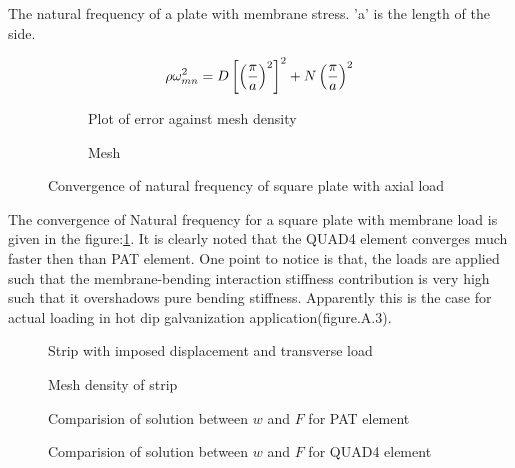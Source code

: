 \documentclass[main.tex]{subfiles}
\begin{document}
The natural frequency of a plate with membrane stress. 'a' is the length of the side.

\begin{equation}{\label{eq:S_N}}
\rho \omega_{mn}^{2} = D \left[ \left( \frac{\pi}{a}\right)^2 \right]^2 + N \left(\frac{\pi}{a} \right)^2 
\end{equation} 

\begin{figure}[t]
\centering
\begin{subfigure}[t]{0.75\textwidth}
\centering


\caption{Plot of error against mesh density}
\label{fig:S_N}
\end{subfigure} \hfill
\begin{subfigure}[t]{0.24\textwidth}
\centering


\caption{Mesh}
\label{fig:Mesh_Density_S}
\end{subfigure}

\caption{Convergence of natural frequency of square plate with axial load}
\end{figure}

The convergence of Natural frequency for a square plate with membrane load is given in the figure:\ref{fig:S_N}. It is clearly noted that the QUAD4 element converges much faster then than PAT element. One point to notice is that, the loads are applied such that the membrane-bending interaction stiffness contribution is very high such that it overshadows pure bending stiffness. Apparently this is the case for actual loading in hot dip galvanization application(figure.A.3). 

\begin{figure}[h!]
\centering

\caption{Strip with imposed displacement and transverse load}
\label{fig:Strip_LOAD_FvsD1}
\end{figure}
\begin{figure}[h!]
\centering

\caption{Mesh density of strip}
\label{fig:Strip_Mesh_Density}
\end{figure}
\begin{figure}[h!]
\centering

\caption{Comparision of solution between $w$ and $F$ for PAT element}
\label{fig:Strip_FvsD_PAT}
\end{figure}
\begin{figure}[h!]
\centering

\caption{Comparision of solution between $w$ and $F$ for QUAD4 element}
\label{fig:Strip_FvsD_MITC4}
\end{figure}
\end{document}
